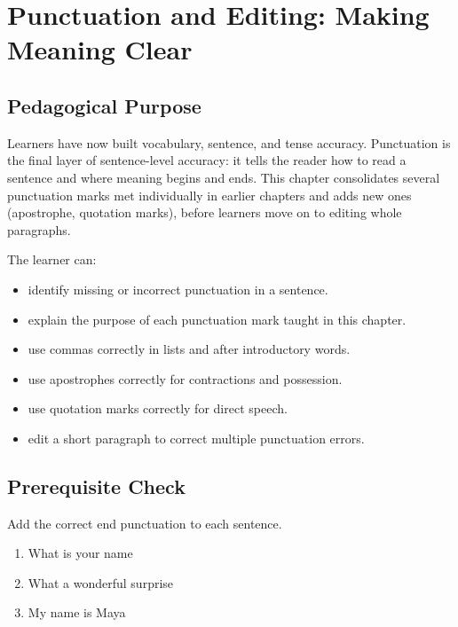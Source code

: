 
\chapter{Punctuation and Editing: Making Meaning Clear}

\section{Pedagogical Purpose}
Learners have now built vocabulary, sentence, and tense accuracy. Punctuation is the final layer of sentence-level accuracy: it tells the reader how to read a sentence and where meaning begins and ends. This chapter consolidates several punctuation marks met individually in earlier chapters and adds new ones (apostrophe, quotation marks), before learners move on to editing whole paragraphs.

\begin{learningobjectives}
The learner can:
\begin{itemize}
    \item identify missing or incorrect punctuation in a sentence.
    \item explain the purpose of each punctuation mark taught in this chapter.
    \item use commas correctly in lists and after introductory words.
    \item use apostrophes correctly for contractions and possession.
    \item use quotation marks correctly for direct speech.
    \item edit a short paragraph to correct multiple punctuation errors.
\end{itemize}
\end{learningobjectives}

\section{Prerequisite Check}
\begin{quickcheck}
Add the correct end punctuation to each sentence.
\begin{enumerate}
    \item What is your name\underline{\hspace{0.5cm}}
    \item What a wonderful surprise\underline{\hspace{0.5cm}}
    \item My name is Maya\underline{\hspace{0.5cm}}
\end{enumerate}
\end{quickcheck}

